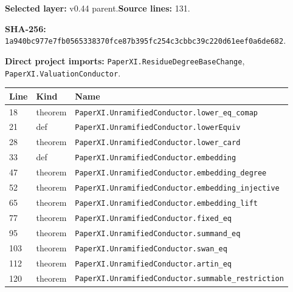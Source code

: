 \documentclass[10pt,oneside]{book}
\begin{document}
\textbf{Selected layer:} v0.44 parent.\quad\textbf{Source lines:} 131.\par\textbf{SHA-256:} {\scriptsize\nolinkurl{1a940bc977e7fb0565338370fce87b395fc254c3cbbc39c220d61eef0a6de682}}.


\textbf{Direct project imports:} \nolinkurl{PaperXI.ResidueDegreeBaseChange}, \nolinkurl{PaperXI.ValuationConductor}.

\begin{longtable}{@{}p{}p{}p{}@{}}\toprule Line&Kind&Name\\\midrule\endhead

18&theorem&\nolinkurl{PaperXI.UnramifiedConductor.lower_eq_comap}\\

21&def&\nolinkurl{PaperXI.UnramifiedConductor.lowerEquiv}\\

28&theorem&\nolinkurl{PaperXI.UnramifiedConductor.lower_card}\\

33&def&\nolinkurl{PaperXI.UnramifiedConductor.embedding}\\

47&theorem&\nolinkurl{PaperXI.UnramifiedConductor.embedding_degree}\\

52&theorem&\nolinkurl{PaperXI.UnramifiedConductor.embedding_injective}\\

65&theorem&\nolinkurl{PaperXI.UnramifiedConductor.embedding_lift}\\

77&theorem&\nolinkurl{PaperXI.UnramifiedConductor.fixed_eq}\\

95&theorem&\nolinkurl{PaperXI.UnramifiedConductor.summand_eq}\\

103&theorem&\nolinkurl{PaperXI.UnramifiedConductor.swan_eq}\\

112&theorem&\nolinkurl{PaperXI.UnramifiedConductor.artin_eq}\\

120&theorem&\nolinkurl{PaperXI.UnramifiedConductor.summable_restriction}\\

\bottomrule\end{longtable}
\end{document}
